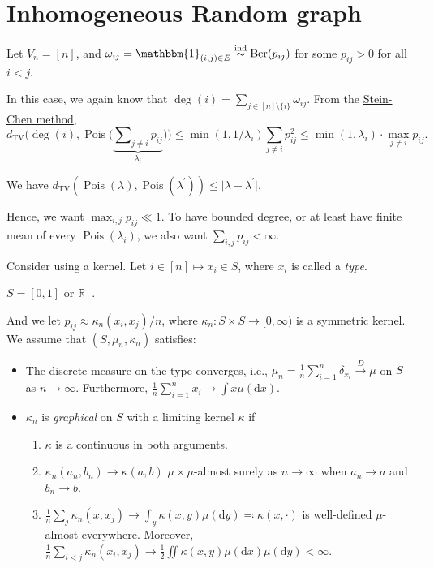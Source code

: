 \section{Inhomogeneous Random graph}
Let \(V_n = [n]\), and \(\omega _{ij} = \mathbbm{1}_{(i, j) \in E} \overset{\text{ind} }{\sim } \operatorname{Ber}(p_{ij}) \) for some \(p_{ij} > 0\) for all \(i < j\).

In this case, we again know that \(\deg (i) = \sum_{j \in [n] \setminus \{ i \} } \omega _{ij}\). From the \hyperref[thm:Stein-Chen-method]{Stein-Chen method},
\[
	d_{\mathrm{TV} }\Big(\deg (i) , \operatorname{Pois}\big(\underbrace{\sum\nolimits_{j \neq i} p_{ij}}_{\lambda _i} \big) \Big)
	\leq \min (1 , 1 / \lambda _i) \sum_{j \neq i} p_{ij}^2
	\leq \min (1, \lambda _i) \cdot \max _{j \neq i} p_{ij}.
\]
\begin{note}
	We have \(d_{\mathrm{TV} }(\operatorname{Pois}(\lambda ) , \operatorname{Pois}(\lambda ^{\prime} ) ) \leq \lvert \lambda - \lambda ^{\prime} \rvert \).
\end{note}

Hence, we want \(\max _{i, j} p_{ij} \ll 1\). To have bounded degree, or at least have finite mean of every \(\operatorname{Pois}(\lambda _i) \), we also want \(\sum_{i, j} p_{ij} < \infty \).

Consider using a kernel. Let \(i \in [n] \mapsto x_i \in S\), where \(x_i\) is called a \emph{type}.

\begin{eg}
	\(S = [0, 1]\) or \(\mathbb{R} ^+\).
\end{eg}

And we let \(p_{ij} \approx \kappa _n(x_i, x_j) / n\), where \(\kappa _n \colon S \times S \to [0, \infty )\) is a symmetric kernel. We assume that \((S, \mu _n, \kappa _n)\) satisfies:
\begin{itemize}
	\item The discrete measure on the type converges, i.e., \(\mu _n = \frac{1}{n} \sum_{i=1}^{n} \delta _{x_i} \overset{D}{\to} \mu \) on \(S\) as \(n \to \infty \). Furthermore, \(\frac{1}{n} \sum_{i=1}^{n} x_i \to \int x \mu (\mathrm{d} x)\).
	\item \(\kappa _n\) is \emph{graphical} on \(S\) with a limiting kernel \(\kappa \) if
	      \begin{enumerate}
		      \item \(\kappa \) is a continuous in both arguments.
		      \item \(\kappa _n(a_n, b_n) \to \kappa (a, b)\) \(\mu \times \mu \)-almost surely as \(n \to \infty \) when \(a_n \to a\) and \(b_n \to b\).
		      \item \(\frac{1}{n} \sum_{j} \kappa _n(x, x_j) \to \int _y \kappa (x, y) \mu (\mathrm{d} y) \eqqcolon \kappa (x, \cdot ) \) is well-defined \(\mu \)-almost everywhere. Moreover, \(\frac{1}{n} \sum_{i < j} \kappa _n(x_i, x_j) \to \frac{1}{2} \iint \kappa (x, y) \mu (\mathrm{d} x) \mu (\mathrm{d} y) < \infty \).
	      \end{enumerate}
\end{itemize}

